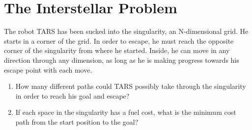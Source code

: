 \chapter{The Interstellar Problem}
The robot TARS has been sucked into the singularity, an N-dimensional grid. He starts in a corner of the grid. In order to escape, he must reach the opposite corner of the singularity from where he started.
Inside, he can move in any direction through any dimension, as long as he is making progress towards his escape point with each move.
\begin{enumerate}
    \item How many different paths could TARS possibly take through the singularity in order to reach his goal and escape?
    \item If each space in the singularity has a fuel cost, what is the minimum cost path from the start position to the goal?
\end{enumerate}


